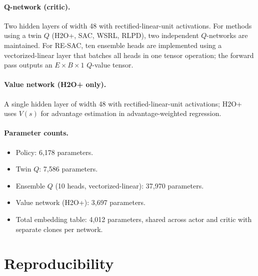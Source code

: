 \documentclass[journal,10pt]{IEEEtran}
\begin{document}
\paragraph{Q-network (critic).} Two hidden layers of width 48 with rectified-linear-unit activations. For methods using a twin $Q$ (H2O+, SAC, WSRL, RLPD), two independent $Q$-networks are maintained. For RE-SAC, ten ensemble heads are implemented using a vectorized-linear layer that batches all heads in one tensor operation; the forward pass outputs an $E \times B \times 1$ $Q$-value tensor.

\paragraph{Value network (H2O+ only).} A single hidden layer of width 48 with rectified-linear-unit activations; H2O+ uses $V(s)$ for advantage estimation in advantage-weighted regression.

\paragraph{Parameter counts.}
\begin{itemize}
\itemsep0em
\item Policy: 6{,}178 parameters.
\item Twin $Q$: 7{,}586 parameters.
\item Ensemble $Q$ (10 heads, vectorized-linear): 37{,}970 parameters.
\item Value network (H2O+): 3{,}697 parameters.
\item Total embedding table: 4{,}012 parameters, shared across actor and critic with separate clones per network.
\end{itemize}

\section{Reproducibility}
\label{app:repro}
\end{document}
